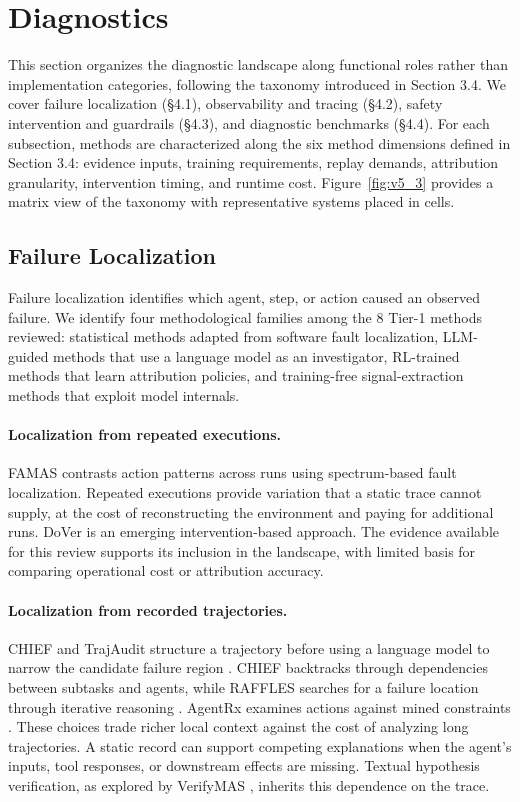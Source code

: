 \documentclass[preprint,12pt]{elsarticle}
\begin{document}
\section{Diagnostics}
This section organizes the diagnostic landscape along functional roles rather than implementation categories, following the taxonomy introduced in Section 3.4. We cover failure localization (\S{}4.1), observability and tracing (\S{}4.2), safety intervention and guardrails (\S{}4.3), and diagnostic benchmarks (\S{}4.4). For each subsection, methods are characterized along the six method dimensions defined in Section 3.4: evidence inputs, training requirements, replay demands, attribution granularity, intervention timing, and runtime cost. Figure~\ref{fig:v5_3} provides a matrix view of the taxonomy with representative systems placed in cells.


\subsection{Failure Localization}


Failure localization identifies which agent, step, or action caused an observed failure. We identify four methodological families among the 8 Tier-1 methods reviewed: statistical methods adapted from software fault localization, LLM-guided methods that use a language model as an investigator, RL-trained methods that learn attribution policies, and training-free signal-extraction methods that exploit model internals.




\paragraph{Localization from repeated executions.}
FAMAS \cite{v5ref11} contrasts action patterns across runs using spectrum-based fault localization. Repeated executions provide variation that a static trace cannot supply, at the cost of reconstructing the environment and paying for additional runs. DoVer \cite{v5ref22} is an emerging intervention-based approach. The evidence available for this review supports its inclusion in the landscape, with limited basis for comparing operational cost or attribution accuracy.

\paragraph{Localization from recorded trajectories.}
CHIEF and TrajAudit structure a trajectory before using a language model to narrow the candidate failure region \cite{v5ref38,v5ref35}. CHIEF backtracks through dependencies between subtasks and agents, while RAFFLES searches for a failure location through iterative reasoning \cite{v5ref51}. AgentRx examines actions against mined constraints \cite{v5ref3}. These choices trade richer local context against the cost of analyzing long trajectories. A static record can support competing explanations when the agent's inputs, tool responses, or downstream effects are missing. Textual hypothesis verification, as explored by VerifyMAS \cite{v5ref31}, inherits this dependence on the trace.
\end{document}
